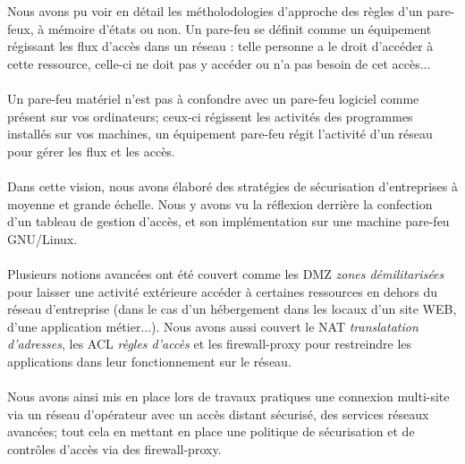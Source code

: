 Nous avons pu voir en détail les métholodologies d'approche des règles d'un pare-feux, à mémoire d'états ou non. Un pare-feu se définit comme un équipement régissant les flux d'accès dans un réseau : telle personne a le droit d'accéder à cette ressource, celle-ci ne doit pas y accéder ou n'a pas besoin de cet accès...
\\ \\
Un pare-feu matériel n'est pas à confondre avec un pare-feu logiciel comme présent sur vos ordinateurs; ceux-ci régissent les activités des programmes installés sur vos machines, un équipement pare-feu régit l'activité d'un réseau pour gérer les flux et les accès.
\\ \\
Dans cette vision, nous avons élaboré des stratégies de sécurisation d'entreprises à moyenne et grande échelle. Nous y avons vu la réflexion derrière la confection d'un tableau de gestion d'accès, et son implémentation sur une machine pare-feu GNU/Linux.
\\ \\
Plusieurs notions avancées ont été couvert comme les DMZ \textit{zones démilitarisées} pour laisser une activité extérieure accéder à certaines ressources en dehors du réseau d'entreprise (dans le cas d'un hébergement dans les locaux d'un site WEB, d'une application métier...). Nous avons aussi couvert le NAT \textit{translatation d'adresses}, les ACL \textit{règles d'accès} et les firewall-proxy pour restreindre les applications dans leur fonctionnement sur le réseau.
\\ \\
Nous avons ainsi mis en place lors de travaux pratiques une connexion multi-site via un réseau d'opérateur avec un accès distant sécurisé, des services réseaux avancées; tout cela en mettant en place une politique de sécurisation et de contrôles d'accès via des firewall-proxy.
